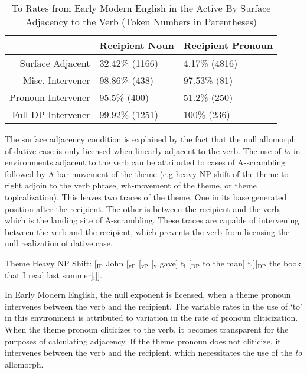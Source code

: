 \begin{table}[ht]
\centering
\begin{tabular}{rll}
  \hline
 & Recipient Noun & Recipient Pronoun \\ 
  \hline
Surface Adjacent & 32.42\% (1166) & 4.17\% (4816) \\ 
  Misc. Intervener & 98.86\% (438) & 97.53\% (81) \\ 
  Pronoun Intervener & 95.5\% (400) & 51.2\% (250) \\ 
  Full DP Intervener & 99.92\% (1251) & 100\% (236) \\ 
   \hline
\end{tabular}
\caption{To Rates from Early Modern English in the Active By Surface Adjacency to the Verb (Token Numbers in Parentheses)} 
\end{table}



The surface adjacency condition is explained by the fact that the null allomorph of dative case is only licensed when linearly adjacent to the verb. The use of \emph{to} in environments adjacent to the verb can be attributed to cases of A-scrambling followed by A-bar movement of the theme (e.g heavy NP shift of the theme to right adjoin to the verb phrase, wh-movement of the theme, or theme topicalization). This leaves two traces of the theme. One in its base generated position after the recipient. The other is between the recipient and the verb, which is the landing site of A-scrambling. These traces are capable of intervening between the verb and the recipient, which prevents the verb from licensing the null realization of dative case.

\begin{exe}
\ex Theme Heavy NP Shift: [$_{\text{IP}}$ John [$_{\text{vP}}$ [$_{\text{vP}}$ [$_{\text{v}}$ gave] t$_{\text{i}}$ [$_{\text{DP}}$ to the man] t$_{\text{i}}$][$_{\text{DP}}$ the book that I read last summer]$_{\text{i}}$]].
\end{exe}

In Early Modern English, the null exponent is licensed, when a theme pronoun intervenes between the verb and the recipient. The variable rates in the use of `to' in this environment is attributed to variation in the rate of pronoun cliticization. When the theme pronoun cliticizes to the verb, it becomes transparent for the purposes of calculating adjacency. If the theme pronoun does not cliticize, it intervenes between the verb and the recipient, which necessitates the use of the \emph{to} allomorph. 


